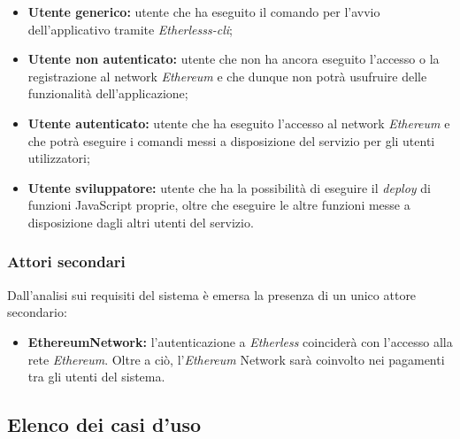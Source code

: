 \begin{itemize}
	\item \textbf{Utente generico:} utente che ha eseguito il comando per l'avvio dell'applicativo tramite \textit{Etherlesss-cli};
	\item \textbf{Utente non autenticato:} utente che non ha ancora eseguito l'accesso o la registrazione al network \textit{Ethereum\glo} e che dunque non potrà usufruire delle funzionalità dell'applicazione;
	\item \textbf{Utente autenticato:} utente che ha eseguito l'accesso al network \textit{Ethereum\glo} e che potrà eseguire i comandi messi a disposizione del servizio per gli utenti utilizzatori;
	\item \textbf{Utente sviluppatore:} utente che ha la possibilità di eseguire il \textit{deploy\glo} di funzioni JavaScript proprie, oltre che eseguire le altre funzioni messe a disposizione dagli altri utenti del servizio.
\end{itemize}


\subsubsection{Attori secondari}
Dall'analisi sui requisiti del sistema è emersa la presenza di un unico attore secondario:
\begin{itemize}
	\item \textbf{Ethereum\glo Network:} l'autenticazione a \textit{Etherless} coinciderà con l'accesso alla rete \textit{Ethereum\glos}. Oltre a ciò, l'\textit{Ethereum\glo} Network sarà coinvolto nei pagamenti tra gli utenti del sistema.
\end{itemize}


\newpage
\subsection{Elenco dei casi d'uso}



\vspace{0.5cm}

\vspace{0.5cm}

\vspace{0.5cm}

\vspace{0.5cm}

\vspace{0.5cm}

\vspace{0.5cm}

\vspace{0.5cm}

\vspace{0.5cm}

\vspace{0.5cm}

\vspace{0.5cm}

\vspace{0.5cm}

